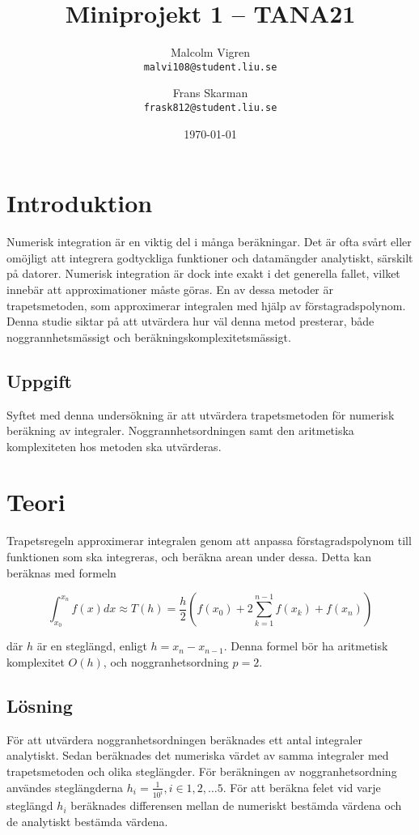 \documentclass[a4paper,titlepage]{article}
\title{
    \textbf{Miniprojekt 1 -- TANA21}}
\date{\today}
\author{%
    Malcolm Vigren \\
    \texttt{malvi108@student.liu.se}
    \and
    Frans Skarman\\
    \texttt{frask812@student.liu.se}
    }
\begin{document}
\maketitle
\newpage
\tableofcontents
\newpage

\section{Introduktion}
Numerisk integration är en viktig del i många beräkningar. Det är ofta svårt
eller omöjligt att integrera godtyckliga funktioner och datamängder analytiskt,
särskilt på datorer. Numerisk integration är dock inte exakt i det generella
fallet, vilket innebär att approximationer måste göras. En av dessa metoder
är trapetsmetoden, som approximerar integralen med hjälp av förstagradspolynom.
Denna studie siktar på att utvärdera hur väl denna metod presterar,
både noggrannhetsmässigt och beräkningskomplexitetsmässigt.

\subsection{Uppgift}
Syftet med denna undersökning är att utvärdera trapetsmetoden för numerisk
beräkning av integraler. Noggrannhetsordningen samt den aritmetiska
komplexiteten hos metoden ska utvärderas.

\section{Teori}
Trapetsregeln approximerar integralen genom att anpassa förstagradspolynom till
funktionen som ska integreras, och beräkna arean under dessa. Detta kan
beräknas med formeln

\begin{equation}
    \int_{x_0}^{x_n}f(x)dx \approx T(h) = \frac{h}{2}(f(x_0) +
    2\sum_{k=1}^{n-1}f(x_k) + f(x_n))
\end{equation}

där $h$ är en steglängd, enligt $h = x_n - x_{n-1}$. Denna formel bör
ha aritmetisk komplexitet $O(h)$, och noggranhetsordning $p=2$.

\subsection{Lösning}

För att utvärdera noggranhetsordningen beräknades ett antal integraler
analytiskt. Sedan beräknades det numeriska värdet av samma integraler med
trapetsmetoden och olika steglängder. För beräkningen av noggranhetsordning
användes steglängderna $h_i = \frac{1}{10^i}, i \in {1,2, \dots 5}$.
För att beräkna felet vid varje steglängd $h_i$ beräknades differensen mellan de numeriskt
bestämda värdena och de analytiskt bestämda värdena.
\end{document}
